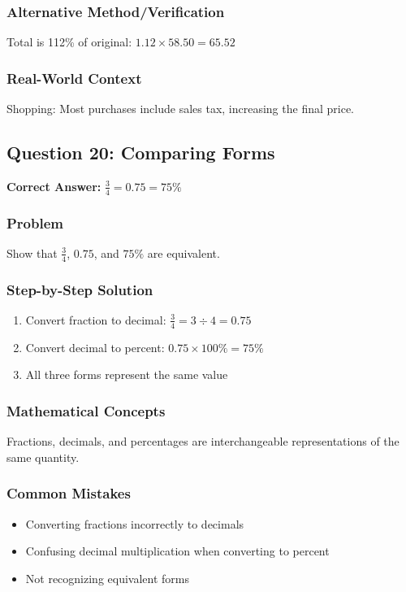 \documentclass[12pt,a4paper]{article}
\begin{document}
\subsubsection*{Alternative Method/Verification}
Total is 112\% of original: $1.12 \times 58.50 = 65.52$ 

\subsubsection*{Real-World Context}
Shopping: Most purchases include sales tax, increasing the final price.

\vspace{0.5cm}

\subsection*{Question 20: Comparing Forms}

\textbf{Correct Answer:} $\frac{3}{4} = 0.75 = 75\%$

\subsubsection*{Problem}
Show that $\frac{3}{4}$, $0.75$, and $75\%$ are equivalent.

\subsubsection*{Step-by-Step Solution}
\begin{enumerate}
    \item Convert fraction to decimal: $\frac{3}{4} = 3 \div 4 = 0.75$
    \item Convert decimal to percent: $0.75 \times 100\% = 75\%$
    \item All three forms represent the same value
\end{enumerate}

\subsubsection*{Mathematical Concepts}
Fractions, decimals, and percentages are interchangeable representations of the same quantity.

\subsubsection*{Common Mistakes}
\begin{itemize}
    \item Converting fractions incorrectly to decimals
    \item Confusing decimal multiplication when converting to percent
    \item Not recognizing equivalent forms
\end{itemize}
\end{document}
